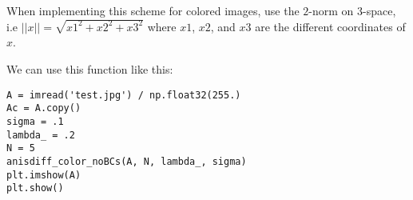 When implementing this scheme for colored images, use the $2$-norm on 3-space, i.e $||x||=\sqrt{x1^2+x2^2+x3^2}$ where $x1$, $x2$, and $x3$ are the different coordinates of $x$.


We can use this function like this:
\begin{lstlisting}
A = imread('test.jpg') / np.float32(255.)
Ac = A.copy()
sigma = .1
lambda_ = .2
N = 5
anisdiff_color_noBCs(A, N, lambda_, sigma)
plt.imshow(A)
plt.show()
\end{lstlisting}

